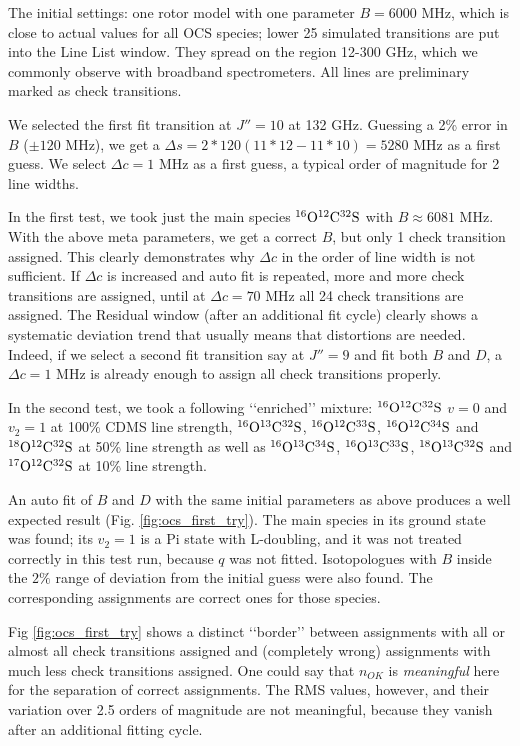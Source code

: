 \documentclass[11pt]{article}
\begin{document}
The initial settings: one rotor model with one parameter $B = 6000$ MHz, which is close to actual values for all OCS species; lower 25 simulated transitions are put into the Line List window. They spread on the region 12-300 GHz, which we commonly observe with broadband spectrometers. All lines are preliminary marked as check transitions. 

We selected the first fit transition at $J'' = 10$ at 132 GHz. Guessing a 2\% error in $B$ ($\pm 120$ MHz), we get a $\Delta s = 2*120(11*12 - 11*10) = 5280$ MHz as a first guess. We select $\Delta c = 1$ MHz as a first guess, a typical order of magnitude for 2 line widths.

In the first test, we took just the main species $\rm ^{16}O^{12}C^{32}S$ with $B \approx 6081$ MHz. With the above meta parameters, we get a correct $B$, but only 1 check transition assigned. This clearly demonstrates why $\Delta c$ in the order of line width is not sufficient. If $\Delta c$ is increased and auto fit is repeated, more and more check transitions are assigned, until at $\Delta c = 70$ MHz all 24 check transitions are assigned. The Residual window (after an additional fit cycle) clearly shows a systematic deviation trend that usually means that distortions are needed. Indeed, if we select a second fit transition say at $J'' = 9$ and fit both $B$ and $D$, a $\Delta c = 1$ MHz is already enough to assign all check transitions properly.

In the second test, we took a following \lq\lq{}enriched\rq\rq{} mixture: $\rm ^{16}O^{12}C^{32}S$ $v = 0$ and $v_2 = 1$ at 100\% CDMS line strength, 
$\rm ^{16}O^{13}C^{32}S$, $\rm ^{16}O^{12}C^{33}S$, $\rm ^{16}O^{12}C^{34}S$ and $\rm ^{18}O^{12}C^{32}S$ at 50\% line strength as well as $\rm ^{16}O^{13}C^{34}S$, $\rm ^{16}O^{13}C^{33}S$, $\rm ^{18}O^{13}C^{32}S$ and $\rm ^{17}O^{12}C^{32}S$ at 10\% line strength. 

An auto fit of $B$ and $D$ with the same initial parameters as above produces a well expected result (Fig. \ref{fig:ocs_first_try}). The main species in its ground state was found; its $v_2 = 1$ is a Pi state with L-doubling, and it was not treated correctly in this test run, because $q$ was not fitted. Isotopologues with $B$ inside the $2\%$ range of deviation from the initial guess were also found. The corresponding assignments are correct ones for those species.

Fig \ref{fig:ocs_first_try} shows a distinct \lq\lq{}border\rq\rq{} between assignments with all or almost all check transitions assigned and (completely wrong) assignments with much less check transitions assigned. One could say that $n_{OK}$ is \emph{meaningful} here for the separation of correct assignments. The RMS values, however, and their variation over 2.5 orders of magnitude are not meaningful, because they vanish after an additional fitting cycle. 
\end{document}
